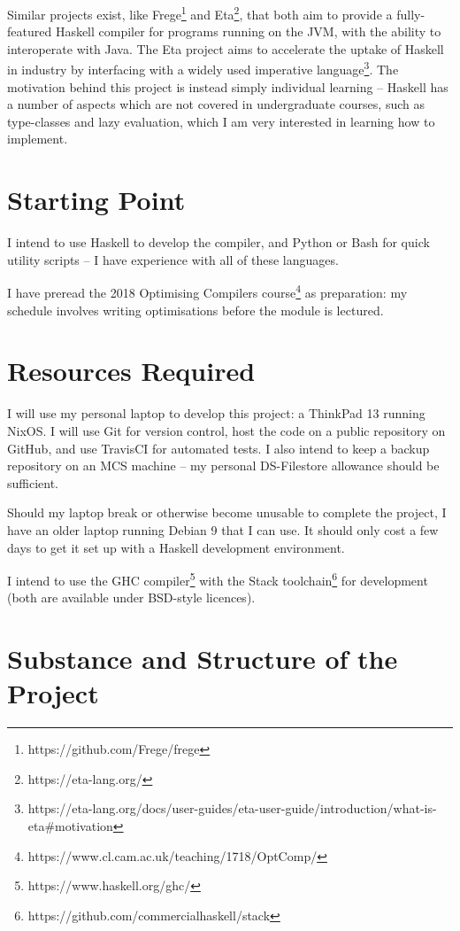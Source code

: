 \documentclass[12pt]{article}
\begin{document}
Similar projects exist, like Frege\footnote{https://github.com/Frege/frege} and Eta\footnote{https://eta-lang.org/},
that both aim to provide a fully-featured Haskell compiler for programs running on the JVM, with the ability to
interoperate with Java. The Eta project aims to accelerate the uptake of Haskell in industry by interfacing with a
widely used imperative
language\footnote{https://eta-lang.org/docs/user-guides/eta-user-guide/introduction/what-is-eta\#motivation}. The
motivation behind this project is instead simply individual learning -- Haskell has a number of aspects which are not
covered in undergraduate courses, such as type-classes and lazy evaluation, which I am very interested in learning how
to implement.


\section*{Starting Point}

I intend to use Haskell to develop the compiler, and Python or Bash for quick utility scripts -- I have experience with
all of these languages.
 
I have preread the 2018 Optimising Compilers course\footnote{https://www.cl.cam.ac.uk/teaching/1718/OptComp/} as
preparation: my schedule involves writing optimisations before the module is lectured.


\section*{Resources Required}

I will use my personal laptop to develop this project: a ThinkPad 13 running NixOS. I will use Git for version control,
host the code on a public repository on GitHub, and use TravisCI for automated tests. I also intend to keep a backup
repository on an MCS machine -- my personal DS-Filestore allowance should be sufficient.

Should my laptop break or otherwise become unusable to complete the project, I have an older laptop running Debian 9
that I can use. It should only cost a few days to get it set up with a Haskell development environment.

I intend to use the GHC compiler\footnote{https://www.haskell.org/ghc/} with the Stack
toolchain\footnote{https://github.com/commercialhaskell/stack} for development (both are available under BSD-style
licences).


\section*{Substance and Structure of the Project}
\end{document}

